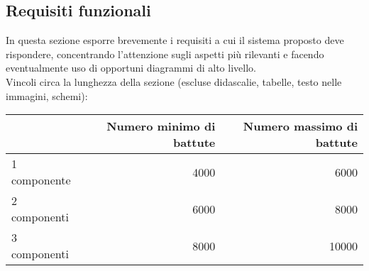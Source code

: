\subsection*{Requisiti funzionali}
In questa sezione esporre brevemente i requisiti a cui il sistema proposto deve rispondere, concentrando l'attenzione sugli aspetti più rilevanti e facendo eventualmente uso di opportuni diagrammi di alto livello.\\

Vincoli circa la lunghezza della sezione (escluse didascalie, tabelle, testo nelle immagini, schemi):

\vspace{1cm}
\begin{tabular}{l|rr}
 & Numero minimo di battute & Numero massimo di battute \\
 \hline
 1 componente & 4000 & 6000 \\
 2 componenti & 6000 & 8000 \\
 3 componenti & 8000 & 10000 \\
 \hline
\end{tabular}


\newpage
